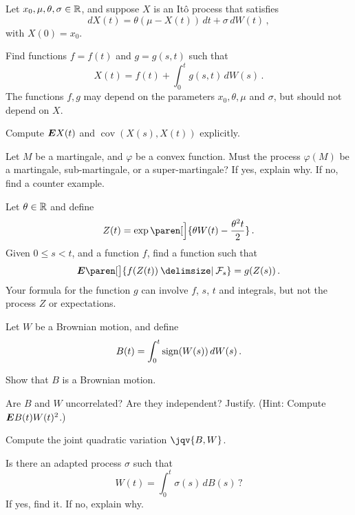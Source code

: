 \begin{problem}
  Let $x_0, \mu, \theta, \sigma \in \mathbb{R}$, and suppose $X$ is an It\^o process that satisfies
  \begin{equation*}
    dX(t) = \theta( \mu - X(t)) \, dt + \sigma \, dW(t)\,,
  \end{equation*}
  with $X(0) = x_0$.
  \begin{parts}
    \item 
      Find functions $f = f(t)$ and $g = g(s, t)$ such that
      \begin{equation*}
	X(t) = f(t) + \int_0^t g(s, t) \, dW(s)\,.
      \end{equation*}
      The functions $f, g$ may depend on the parameters $x_0, \theta, \mu$ and $\sigma$, but should not depend on $X$.
    \item
      Compute $\bm{E} X(t)$ and $\operatorname{cov}(X(s), X(t))$ explicitly.
  \end{parts}
\end{problem}

\begin{problem}
  Let $M$ be a martingale, and $\varphi$ be a convex function.
  Must the process $\varphi(M)$ be a martingale, sub-martingale, or a super-martingale?
  If yes, explain why.
  If no, find a counter example.
\end{problem}

\begin{problem}
  Let $\theta \in \mathbb{R}$ and define
  \begin{equation*}
    Z(t) = \exp\paren[\Big]{ \theta W(t) - \frac{\theta^2 t}{2}}\,.
  \end{equation*}
  Given $0 \leq s < t$, and a function $f$, find a function such that
  \begin{equation*}
    \E\paren[\big]{ f(Z(t)) \given \mathcal F_s } = g(Z(s))\,.
  \end{equation*}
  Your formula for the function $g$ can involve $f$, $s$, $t$ and integrals, but not the process $Z$ or expectations.
\end{problem}

\begin{problem}
  Let $W$ be a Brownian motion, and define
  \begin{equation*}
    B(t) = \int_0^t \operatorname{sign}(W(s)) \, dW(s)\,.
  \end{equation*}
  \begin{parts}
    \item
      Show that $B$ is a Brownian motion.
    \item
      Are $B$ and $W$ uncorrelated?
      Are they independent?
      Justify.
      (Hint: Compute $\bm{E} B(t) W(t)^2$.)
    \item
      Compute the joint quadratic variation $\jqv{B, W}$.

    \item
      Is there an adapted process $\sigma$ such that
      \begin{equation*}
	W(t) = \int_0^t \sigma(s) \, dB(s)\,?
      \end{equation*}
      If yes, find it.
      If no, explain why.
  \end{parts}
\end{problem}


\iffalse
\begin{problem}
  Kolmogorov forward equation.
\end{problem}
\fi

